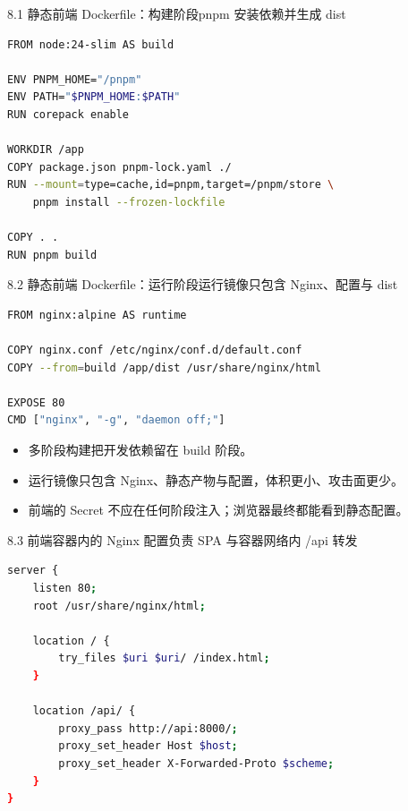 
\begin{frame}[fragile]{8.1 静态前端 Dockerfile：构建阶段}{pnpm 安装依赖并生成 dist}
  \begin{lstlisting}[language=bash]
FROM node:24-slim AS build

ENV PNPM_HOME="/pnpm"
ENV PATH="$PNPM_HOME:$PATH"
RUN corepack enable

WORKDIR /app
COPY package.json pnpm-lock.yaml ./
RUN --mount=type=cache,id=pnpm,target=/pnpm/store \
    pnpm install --frozen-lockfile

COPY . .
RUN pnpm build
  \end{lstlisting}
\end{frame}

\begin{frame}[fragile]{8.2 静态前端 Dockerfile：运行阶段}{运行镜像只包含 Nginx、配置与 dist}
  \begin{lstlisting}[language=bash]
FROM nginx:alpine AS runtime

COPY nginx.conf /etc/nginx/conf.d/default.conf
COPY --from=build /app/dist /usr/share/nginx/html

EXPOSE 80
CMD ["nginx", "-g", "daemon off;"]
  \end{lstlisting}
  \begin{itemize}
    \item 多阶段构建把开发依赖留在 build 阶段。
    \item 运行镜像只包含 Nginx、静态产物与配置，体积更小、攻击面更少。
    \item 前端的 Secret 不应在任何阶段注入；浏览器最终都能看到静态配置。
  \end{itemize}
\end{frame}

\begin{frame}[fragile]{8.3 前端容器内的 Nginx 配置}{负责 SPA 与容器网络内 /api 转发}
  \begin{lstlisting}[language=bash]
server {
    listen 80;
    root /usr/share/nginx/html;

    location / {
        try_files $uri $uri/ /index.html;
    }

    location /api/ {
        proxy_pass http://api:8000/;
        proxy_set_header Host $host;
        proxy_set_header X-Forwarded-Proto $scheme;
    }
}
  \end{lstlisting}
\end{frame}

